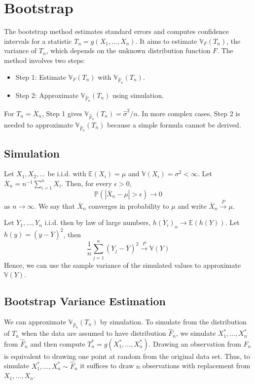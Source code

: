 \section{Bootstrap}

The bootstrap method estimates standard errors and computes confidence intervals for a statistic $T_n=g(X_1, \ldots, X_n)$. It aims to estimate $\mathbb{V}_F(T_n)$, the variance of $T_n$, which depends on the unknown distribution function $F$. The method involves two steps:

\begin{itemize}
	\item Step 1: Estimate $\mathbb{V}_F(T_n)$ with $\mathbb{V}_{\widehat{F}_n}(T_n)$.
	\item Step 2: Approximate $\mathbb{V}_{\widehat{F}_n}(T_n)$ using simulation.
\end{itemize}

For $T_n=\overline{X}_n$, Step 1 gives $\mathbb{V}_{\widehat{F}_n}(T_n) = \widehat{\sigma}^2 / n$. In more complex cases, Step 2 is needed to approximate $\mathbb{V}_{\widehat{F}_n}(T_n)$ because a simple formula cannot be derived.

\subsection{Simulation}

\begin{theorem}
Let $X_1, X_2, \ldots$ be i.i.d. with $\mathbb{E}\left(X_i\right)=\mu$ and $\mathbb{V}\left(X_i\right)=\sigma^2<\infty$. Let $\overline{X}_n=n^{-1} \sum_{i=1}^n X_i$. Then, for every $\epsilon>0$,
\[
\mathbb{P}\left(\left|\overline{X}_n-\mu\right|>\epsilon\right) \rightarrow 0
\]as $n \rightarrow \infty$. We say that $\overline{X}_n$ converges in probability to $\mu$ and write $\overline{X}_n \xrightarrow{P} \mu$.
\end{theorem}
Let $Y_1,\dots,Y_n$ i.i.d. then by law of large numbers, $\overline{h(Y_i)}_n\to \mathbb{E}(h(Y))$. Let $h(y)=(y-\overline{Y})^2$, then
\[
\frac{1}{n}\sum_{j=1}^{n} (Y_j-\overline{Y})^2\overset{ P }{ \to }\mathbb{V}(Y)
\]
Hence, we can use the sample variance of the simulated values to approximate $\mathbb{V}(Y)$.

\subsection{Bootstrap Variance Estimation}

We can approximate $\mathbb{V}_{\widehat{F}_n}\left(T_n\right)$ by simulation. To simulate from the distribution of $T_n$ when the data are assumed to have distribution $\widehat{F}_n$, we simulate $X_1^*, \ldots, X_n^*$ from $\widehat{F}_n$ and then compute $T_n^*=g\left(X_1^*, \ldots, X_n^*\right)$. Drawing an observation from $\widehat{F}_n$ is equivalent to drawing one point at random from the original data set. Thus, to simulate $X_1^*, \ldots, X_n^* \sim \widehat{F}_n$ it suffices to draw $n$ observations with replacement from $X_1, \ldots, X_n$.

